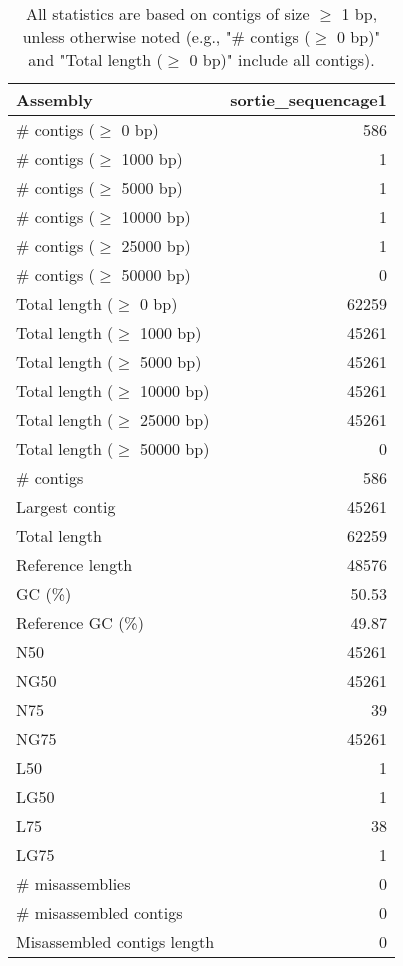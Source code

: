 \documentclass[12pt,a4paper]{article}
\begin{document}
\begin{table}[ht]
\begin{center}
\caption{All statistics are based on contigs of size $\geq$ 1 bp, unless otherwise noted (e.g., "\# contigs ($\geq$ 0 bp)" and "Total length ($\geq$ 0 bp)" include all contigs).}
\begin{tabular}{|l*{1}{|r}|}
\hline
Assembly & sortie\_sequencage1 \\ \hline
\# contigs ($\geq$ 0 bp) & 586 \\ \hline
\# contigs ($\geq$ 1000 bp) & 1 \\ \hline
\# contigs ($\geq$ 5000 bp) & 1 \\ \hline
\# contigs ($\geq$ 10000 bp) & 1 \\ \hline
\# contigs ($\geq$ 25000 bp) & 1 \\ \hline
\# contigs ($\geq$ 50000 bp) & 0 \\ \hline
Total length ($\geq$ 0 bp) & 62259 \\ \hline
Total length ($\geq$ 1000 bp) & 45261 \\ \hline
Total length ($\geq$ 5000 bp) & 45261 \\ \hline
Total length ($\geq$ 10000 bp) & 45261 \\ \hline
Total length ($\geq$ 25000 bp) & 45261 \\ \hline
Total length ($\geq$ 50000 bp) & 0 \\ \hline
\# contigs & 586 \\ \hline
Largest contig & 45261 \\ \hline
Total length & 62259 \\ \hline
Reference length & 48576 \\ \hline
GC (\%) & 50.53 \\ \hline
Reference GC (\%) & 49.87 \\ \hline
N50 & 45261 \\ \hline
NG50 & 45261 \\ \hline
N75 & 39 \\ \hline
NG75 & 45261 \\ \hline
L50 & 1 \\ \hline
LG50 & 1 \\ \hline
L75 & 38 \\ \hline
LG75 & 1 \\ \hline
\# misassemblies & 0 \\ \hline
\# misassembled contigs & 0 \\ \hline
Misassembled contigs length & 0 \\ \hline

\end{tabular}
\end{center}
\end{table}
\end{document}
